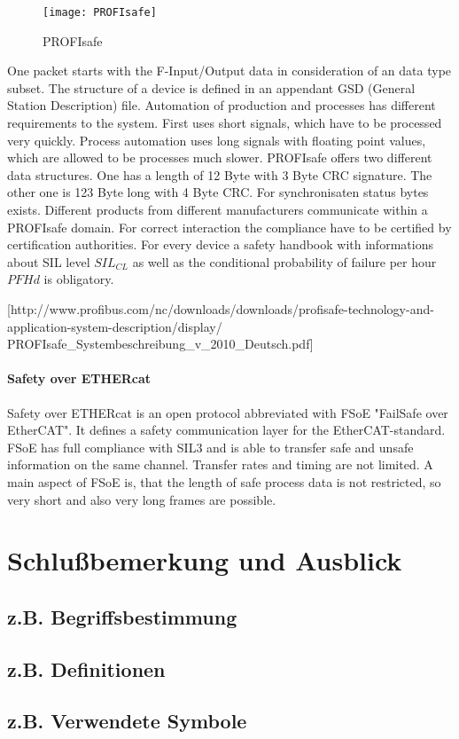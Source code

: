 \documentclass[11pt]{report}
\begin{document}
\begin{center}
\begin{figure}[htbp]
\texttt{[image: PROFIsafe]}
\caption{PROFIsafe}
\label{Abb.:1}
\end{figure}
\end{center}

One packet starts with the F-Input/Output data in consideration of an data type subset. The structure of a device is defined in an appendant GSD (General Station Description) file. Automation of production and processes has different requirements to the system. First uses short signals, which have to be processed very quickly. Process automation uses long signals with floating point values, which are allowed to be processes much slower. PROFIsafe 
offers two different data structures. One has a length of 12 Byte with 3 Byte CRC signature. The other one is 123 Byte long with 4 Byte CRC. For synchronisaten status bytes exists. Different products from different manufacturers communicate within a PROFIsafe domain. For correct interaction the compliance have to be certified by certification authorities. For every device a safety handbook with informations about SIL level $SIL_{CL}$ as well as the conditional probability of failure per hour $PFHd$ is obligatory.

[http://www.profibus.com/nc/downloads/downloads/profisafe-technology-and-application-system-description/display/ PROFIsafe_Systembeschreibung_v_2010_Deutsch.pdf]


\subsubsection{Safety over ETHERcat}
Safety over ETHERcat is an open protocol abbreviated with FSoE "FailSafe over EtherCAT". It defines a safety communication layer for the EtherCAT-standard. FSoE has full compliance with SIL3 and is able to transfer safe and unsafe information on the same channel. Transfer rates and timing are not limited. A main aspect of FSoE is, that the length of safe process data is not restricted, so very short and also very long frames are possible.




\chapter{Schlu{\ss}bemerkung und Ausblick}
  \label{kap:ausblick}

\begin{appendix}
\chapter{z.B. Begriffsbestimmung}
\section{z.B. Definitionen}
%
\section{z.B. Verwendete Symbole}
%
\end{appendix}
\end{document}
